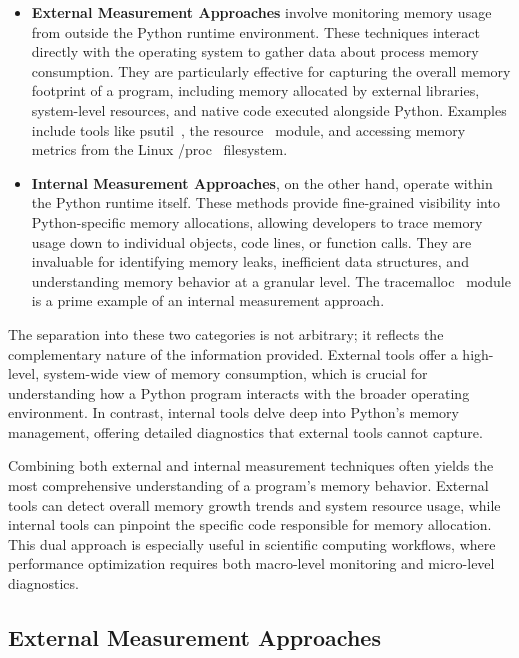 \begin{itemize}
    \item \textbf{External Measurement Approaches}
    involve monitoring memory usage from outside the Python runtime environment.
    These techniques interact directly with the operating system to gather data about process memory consumption.
    They are particularly effective for capturing the overall memory footprint of a program, including memory allocated by external libraries, system-level resources, and native code executed alongside Python.
    Examples include tools like psutil~\cite{psutil}, the resource~\cite{importlib_resources} module, and accessing memory metrics from the Linux /proc~\cite{procfs} filesystem.

    \item \textbf{Internal Measurement Approaches},
    on the other hand, operate within the Python runtime itself.
    These methods provide fine-grained visibility into Python-specific memory allocations, allowing developers to trace memory usage down to individual objects, code lines, or function calls.
    They are invaluable for identifying memory leaks, inefficient data structures, and understanding memory behavior at a granular level.
    The tracemalloc~\cite{tracemalloc} module is a prime example of an internal measurement approach.
\end{itemize}

The separation into these two categories is not arbitrary; it reflects the complementary nature of the information provided.
External tools offer a high-level, system-wide view of memory consumption, which is crucial for understanding how a Python program interacts with the broader operating environment.
In contrast, internal tools delve deep into Python’s memory management, offering detailed diagnostics that external tools cannot capture.

Combining both external and internal measurement techniques often yields the most comprehensive understanding of a program’s memory behavior.
External tools can detect overall memory growth trends and system resource usage, while internal tools can pinpoint the specific code responsible for memory allocation.
This dual approach is especially useful in scientific computing workflows, where performance optimization requires both macro-level monitoring and micro-level diagnostics.

\subsection{External Measurement Approaches}
\label{subsec:mmc-external-measurement-approaches}

